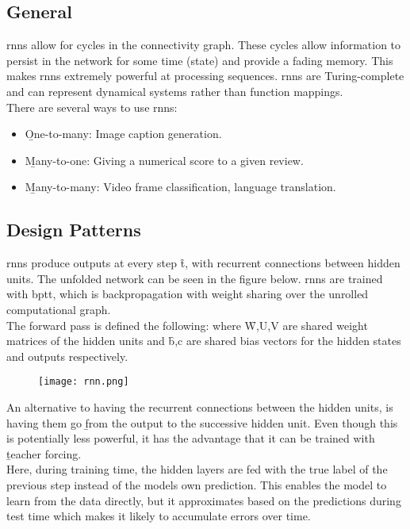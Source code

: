 \subsection{General}
\acp{rnn} allow for cycles in the connectivity graph. These cycles allow information to persist in the network for some time (state) and provide a fading memory. This makes \acp{rnn} extremely powerful at processing sequences. \b{\acp{rnn} are Turing-complete and can represent dynamical systems rather than function mappings.}\\
There are several ways to use \acp{rnn}:
\begin{itemize}
    \item \b{One-to-many:} Image caption generation.
    \item \b{Many-to-one:} Giving a numerical score to a given review.
    \item \b{Many-to-many:} Video frame classification, language translation.
\end{itemize}

\subsection{Design Patterns}
\acp{rnn} produce outputs at every step \f{t}, with recurrent connections between hidden units. The unfolded network can be seen in the figure below. \acp{rnn} are trained with \ac{bptt}, which is backpropagation with weight sharing over the unrolled computational graph.\\
The forward pass is defined the following:
where \f{W,U,V} are shared weight matrices of the hidden units and \f{b,c} are shared bias vectors for the hidden states and outputs respectively.\\[0.5em]

\begin{figure}[ht]
    \centering
    \texttt{[image: rnn.png]}
\end{figure}


An alternative to having the recurrent connections between the hidden units, is having them go \b{from the output to the successive hidden unit}. Even though this is potentially less powerful, it has the advantage that it can be trained with \b{teacher forcing}.\\
Here, during training time, the hidden layers are fed with the true label of the previous step instead of the models own prediction. This enables the model to learn from the data directly, but it approximates based on the predictions during test time which makes it likely to accumulate errors over time.

